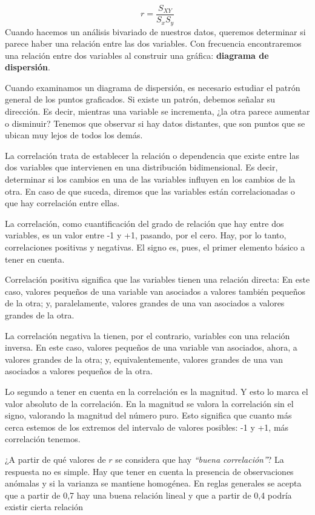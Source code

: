 \documentclass[
  letterpaper,
  DIV=11,
  numbers=noendperiod]{scrartcl}
\begin{document}
\[r = \frac{S_{XY}}{S_xS_y} \] Cuando hacemos un análisis bivariado de
nuestros datos, queremos determinar si parece haber una relación entre
las dos variables. Con frecuencia encontraremos una relación entre dos
variables al construir una gráfica: \textbf{diagrama de dispersión}.

Cuando examinamos un diagrama de dispersión, es necesario estudiar el
patrón general de los puntos graficados. Si existe un patrón, debemos
señalar su dirección. Es decir, mientras una variable se incrementa, ¿la
otra parece aumentar o disminuir? Tenemos que observar si hay datos
distantes, que son puntos que se ubican muy lejos de todos los demás.

La correlación trata de establecer la relación o dependencia que existe
entre las dos variables que intervienen en una distribución
bidimensional. Es decir, determinar si los cambios en una de las
variables influyen en los cambios de la otra. En caso de que suceda,
diremos que las variables están correlacionadas o que hay correlación
entre ellas.

La correlación, como cuantificación del grado de relación que hay entre
dos variables, es un valor entre -1 y +1, pasando, por el cero. Hay, por
lo tanto, correlaciones positivas y negativas. El signo es, pues, el
primer elemento básico a tener en cuenta.

Correlación positiva significa que las variables tienen una relación
directa: En este caso, valores pequeños de una variable van asociados a
valores también pequeños de la otra; y, paralelamente, valores grandes
de una van asociados a valores grandes de la otra.

La correlación negativa la tienen, por el contrario, variables con una
relación inversa. En este caso, valores pequeños de una variable van
asociados, ahora, a valores grandes de la otra; y, equivalentemente,
valores grandes de una van asociados a valores pequeños de la otra.

Lo segundo a tener en cuenta en la correlación es la magnitud. Y esto lo
marca el valor absoluto de la correlación. En la magnitud se valora la
correlación sin el signo, valorando la magnitud del número puro. Esto
significa que cuanto más cerca estemos de los extremos del intervalo de
valores posibles: -1 y +1, más correlación tenemos.

¿A partir de qué valores de \(r\) se considera que hay \emph{``buena
correlación''}? La respuesta no es simple. Hay que tener en cuenta la
presencia de observaciones anómalas y si la varianza se mantiene
homogénea. En reglas generales se acepta que a partir de 0,7 hay una
buena relación lineal y que a partir de 0,4 podría existir cierta
relación
\end{document}
